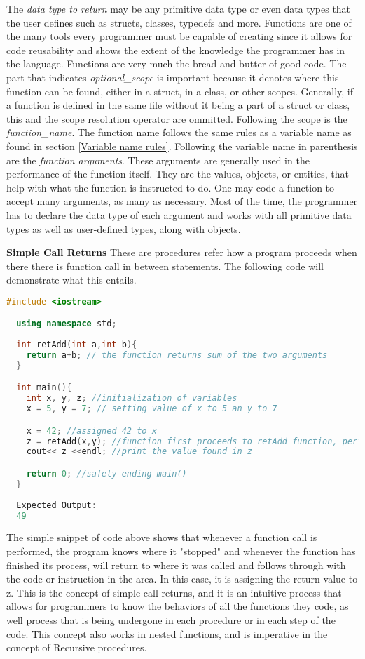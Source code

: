 \documentclass[12pt]{article}
\begin{document}
The \textit{data type to return} may be any primitive data type or even data types that the user defines such as structs, classes, typedefs and more. Functions are one of the many tools every programmer must be capable of creating since it allows for code reusability and shows the extent of the knowledge the programmer has in the language. Functions are very much the bread and butter of good code. The part that indicates \textit{optional\_scope} is important because it denotes where this function can be found, either in a struct, in a class, or other scopes. Generally, if a function is defined in the same file without it being a part of a struct or class, this and the scope resolution operator are ommitted. Following the scope is the \textit{function\_name}. The function name follows the same rules as a variable name as found in section \ref{Variable name rules}. Following the variable name in parenthesis are the \textit{function arguments}. These arguments are generally used in the performance of the function itself. They are the values, objects, or entities, that help with what the function is instructed to do. One may code a function to accept many arguments, as many as necessary. Most of the time, the programmer has to declare the data type of each argument and works with all primitive data types as well as user-defined types, along with objects.

\textbf{Simple Call Returns} These are procedures refer how a program proceeds when there there is function call in between statements. The following code will demonstrate what this entails.
\begin{lstlisting}[language=C++]
  #include <iostream>

  using namespace std;
  
  int retAdd(int a,int b){
    return a+b; // the function returns sum of the two arguments
  }

  int main(){
    int x, y, z; //initialization of variables
    x = 5, y = 7; // setting value of x to 5 an y to 7

    x = 42; //assigned 42 to x
    z = retAdd(x,y); //function first proceeds to retAdd function, performs its process, and its return value is then assigned to z
    cout<< z <<endl; //print the value found in z

    return 0; //safely ending main()
  }
  -------------------------------
  Expected Output:
  49
\end{lstlisting}

The simple snippet of code above shows that whenever a function call is performed, the program knows where it "stopped" and whenever the function has finished its process, will return to where it was called and follows through with the code or instruction in the area. In this case, it is assigning the return value to z. This is the concept of simple call returns, and it is an intuitive process that allows for programmers to know the behaviors of all the functions they code, as well process that is being undergone in each procedure or in each step of the code. This concept also works in nested functions, and is imperative in the concept of Recursive procedures.
\end{document}
